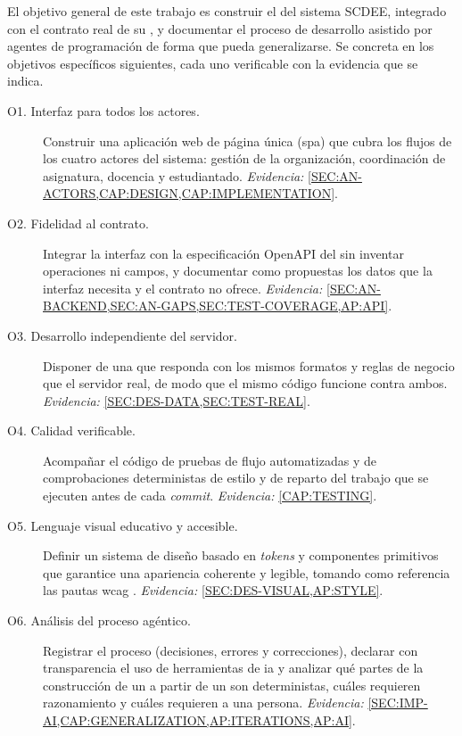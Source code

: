 El objetivo general de este trabajo es construir el  del sistema SCDEE,
integrado con el contrato real de su , y documentar el proceso de desarrollo
asistido por agentes de programación de forma que pueda generalizarse. Se concreta en los
objetivos específicos siguientes, cada uno verificable con la evidencia que se indica.

\begin{description}
  \item[O1. Interfaz para todos los actores.] Construir una aplicación web de página única
        (\acs{spa}) que cubra los flujos de los cuatro actores del sistema: gestión de la
        organización, coordinación de asignatura, docencia y estudiantado.
        \emph{Evidencia:} \cref{SEC:AN-ACTORS,CAP:DESIGN,CAP:IMPLEMENTATION}.
  \item[O2. Fidelidad al contrato.] Integrar la interfaz con la especificación OpenAPI del
         sin inventar operaciones ni campos, y documentar como propuestas los
        datos que la interfaz necesita y el contrato no ofrece.
        \emph{Evidencia:} \cref{SEC:AN-BACKEND,SEC:AN-GAPS,SEC:TEST-COVERAGE,AP:API}.
  \item[O3. Desarrollo independiente del servidor.] Disponer de una  que responda
        con los mismos formatos y reglas de negocio que el servidor real, de modo que el
        mismo código funcione contra ambos.
        \emph{Evidencia:} \cref{SEC:DES-DATA,SEC:TEST-REAL}.
  \item[O4. Calidad verificable.] Acompañar el código de pruebas de flujo automatizadas y
        de comprobaciones deterministas de estilo y de reparto del trabajo que se ejecuten
        antes de cada \textit{commit}.
        \emph{Evidencia:} \cref{CAP:TESTING}.
  \item[O5. Lenguaje visual educativo y accesible.] Definir un sistema de diseño basado en
        \textit{tokens} y componentes primitivos que garantice una apariencia coherente y
        legible, tomando como referencia las pautas \acs{wcag} \cite{wcag22}.
        \emph{Evidencia:} \cref{SEC:DES-VISUAL,AP:STYLE}.
  \item[O6. Análisis del proceso agéntico.] Registrar el proceso (decisiones, errores y
        correcciones), declarar con transparencia el uso de herramientas de \acs{ia} y
        analizar qué partes de la construcción de un  a partir de un
         son deterministas, cuáles requieren razonamiento y cuáles requieren
        a una persona.
        \emph{Evidencia:} \cref{SEC:IMP-AI,CAP:GENERALIZATION,AP:ITERATIONS,AP:AI}.
\end{description}

